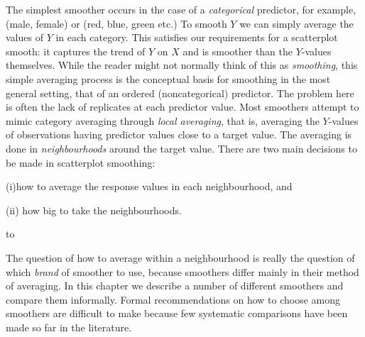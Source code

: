 The  simplest smoother occurs in the case of a {\sl categorical}
predictor,
for example,  (male, female) or  (red, blue, green etc.)
To smooth $Y$ we can simply average the values of $Y$ in each category.
%
This  satisfies our requirements for a scatterplot smooth: it  captures the
 trend of $Y$ on $X$ and is  smoother than the $Y$-values themselves.
%
%
While the reader might not normally think of this as {\sl smoothing}, this simple
averaging process is the conceptual basis for 
smoothing in the most general setting, that of an ordered (noncategorical)
predictor.
The problem here is often the lack of replicates at each 
predictor value.
%
%
Most smoothers attempt to mimic category averaging through
 {\sl local averaging}, that is,
averaging the
$Y$-values of observations having predictor  values close to a target
value.
%
%
The averaging is done in {\sl neighbourhoods} around the target value.
%
There are  two main  decisions to be made in scatterplot
smoothing:\smallskip
{\parindent 20pt
\item{(i)}how to average the
response values in each  neighbourhood, and
\item{(ii)} how big to take the neighbourhoods.

}\smallskip
\pageinsert
\vbox to 
\endinsert
\par
The question of how to average within a neighbourhood is really the
question of which {\sl brand} of smoother to use, because  smoothers
differ mainly  in their method  of averaging.
In this chapter  we describe a number of different smoothers and
compare them informally.
Formal recommendations  on how to choose among smoothers are
difficult to make because 
 few systematic  comparisons  have been made so far in the
literature.

